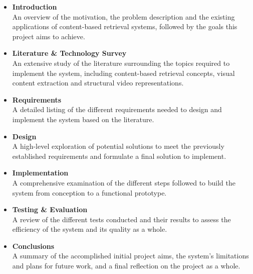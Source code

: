 \begin{itemize}
    \item \textbf{Introduction}\\
    An overview of the motivation, the problem description and the existing applications of content-based retrieval systems, followed by the goals this project aims to achieve.
    \item \textbf{Literature \& Technology Survey}\\
    An extensive study of the literature surrounding the topics required to implement the system, including content-based retrieval concepts, visual content extraction and structural video representations.
    \item \textbf{Requirements}\\
    A detailed listing of the different requirements needed to design and implement the system based on the literature.
    \item \textbf{Design}\\
    A high-level exploration of potential solutions to meet the previously established requirements and formulate a final solution to implement.\\
    \item \textbf{Implementation}\\
    A comprehensive examination of the different steps followed to build the system from conception to a functional prototype.
    \item \textbf{Testing \& Evaluation}\\
    A review of the different tests conducted and their results to assess the efficiency of the system and its quality as a whole.
    \item \textbf{Conclusions}\\
    A summary of the accomplished initial project aims, the system's limitations and plans for future work, and a final reflection on the project as a whole.
\end{itemize}